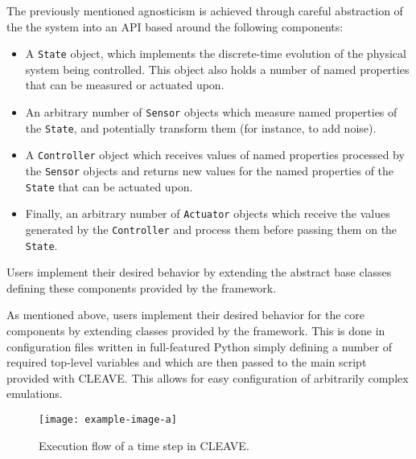 \begin{description}[wide]
    \item[API based on well-defined components.]
    The previously mentioned agnosticism is achieved through careful abstraction of the the system into an API based around the following components:
    \begin{itemize}
        \item A \texttt{State} object, which implements the discrete-time evolution of the physical system being controlled.
        This object also holds a number of named properties that can be measured or actuated upon.
        \item An arbitrary number of \texttt{Sensor} objects which measure named properties of the \texttt{State}, and potentially transform them (for instance, to add noise).
        \item A \texttt{Controller} object which receives values of named properties processed by the \texttt{Sensor} objects and returns new values for the named properties of the \texttt{State} that can be actuated upon.
        \item Finally, an arbitrary number of \texttt{Actuator} objects which receive the values generated by the \texttt{Controller} and process them before passing them on the \texttt{State}.
    \end{itemize}
    Users implement their desired behavior by extending the abstract base classes defining these components provided by the framework.

    \item[Plain Python configuration.]
    As mentioned above, users implement their desired behavior for the core components by extending classes provided by the framework.
    This is done in configuration files written in full-featured Python simply defining a number of required top-level variables and which are then passed to the main script provided with CLEAVE.
    This allows for easy configuration of arbitrarily complex emulations.
    
\end{description}

\begin{figure}
    \centering
    \texttt{[image: example-image-a]}
    \caption{Execution flow of a time step in CLEAVE.}
\end{figure}
    
